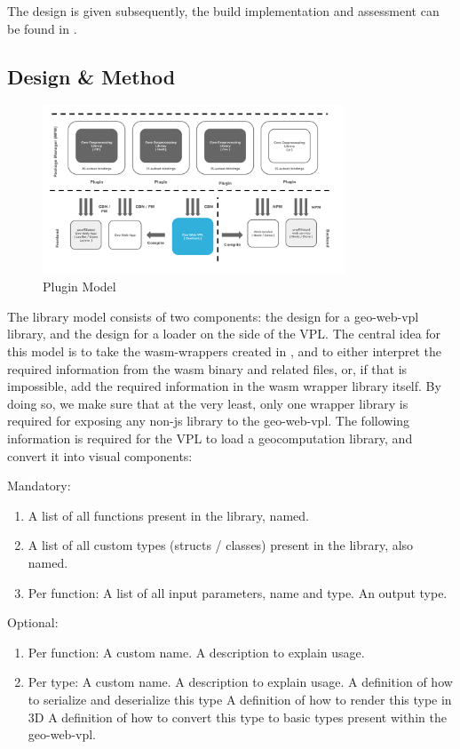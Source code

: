 The design is given subsequently, the build implementation and assessment can be found in .

\subsection{Design \& Method}

\begin{figure}
  \centering
  \graphicspath{ {../../assets/diagrams/} }
  \includegraphics[width=340px]{Model Proposal.png}
  \caption{Plugin Model}
  \label{fig:plugin-model}
\end{figure}

The library model consists of two components: the design for a geo-web-vpl library, and the design for a 
loader on the side of the VPL. 
The central idea for this model is to take the wasm-wrappers created in , and to either interpret the required information from the wasm binary and related files, or, if that is impossible, add the required information in the wasm wrapper library itself.
By doing so, we make sure that at the very least, only one wrapper library is required for exposing any non-js library to the \ac{geo-web-vpl}.
The following information is required for the VPL to load a geocomputation library, and convert it into visual components:

Mandatory: 
\begin{enumerate}[-]
  \item A list of all functions present in the library, named.
  \item A list of all custom types (structs / classes) present in the library, also named.
  \item Per function:  
  \subitem A list of all input parameters, name and type.
  \subitem An output type.
\end{enumerate}

Optional: 
\begin{enumerate}[-]
  \item Per function:
  \subitem A custom name.
  \subitem A description to explain usage.

  \item Per type:
  \subitem A custom name.
  \subitem A description to explain usage.
  \subitem A definition of how to serialize and deserialize this type  
  \subitem A definition of how to render this type in 3D
  \subitem A definition of how to convert this type to basic types present within the geo-web-vpl.  
\end{enumerate}

